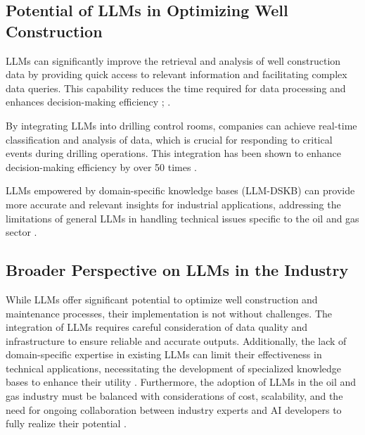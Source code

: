         \subsection{Potential of LLMs in Optimizing Well Construction}
               
            LLMs can significantly improve the retrieval and analysis of well construction data by providing quick access to relevant information and facilitating complex data queries. This capability reduces the time required for data processing and enhances decision-making efficiency \cite{Michael_Yi_2024}; \cite{Myriam_Amour_2024}.
            
            By integrating LLMs into drilling control rooms, companies can achieve real-time classification and analysis of data, which is crucial for responding to critical events during drilling operations. This integration has been shown to enhance decision-making efficiency by over 50 times \cite{E_Ferrigno_2024}.
            
            LLMs empowered by domain-specific knowledge bases (LLM-DSKB) can provide more accurate and relevant insights for industrial applications, addressing the limitations of general LLMs in handling technical issues specific to the oil and gas sector \cite{Huan_Wang_2023}.
            
            
        \subsection{Broader Perspective on LLMs in the Industry}
        
            While LLMs offer significant potential to optimize well construction and maintenance processes, their implementation is not without challenges. The integration of LLMs requires careful consideration of data quality and infrastructure to ensure reliable and accurate outputs. Additionally, the lack of domain-specific expertise in existing LLMs can limit their effectiveness in technical applications, necessitating the development of specialized knowledge bases to enhance their utility . Furthermore, the adoption of LLMs in the oil and gas industry must be balanced with considerations of cost, scalability, and the need for ongoing collaboration between industry experts and AI developers to fully realize their potential .
        
